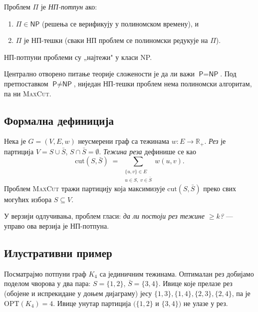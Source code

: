 \begin{definition}
Проблем $\Pi$ је \emph{НП-потпун} ако:
\begin{enumerate}[nosep]
  \item $\Pi \in \textsf{NP}$ (решења се верификују у полиномском времену), и
  \item $\Pi$ је НП-тешки (сваки НП проблем се полиномски редукује на $\Pi$).
\end{enumerate}
НП-потпуни проблеми су „најтежи" у класи \textsf{NP}.
\end{definition}

\begin{remark}
Централно отворено питање теорије сложености је да ли важи $\textsf{P} = \textsf{NP}$.
Под претпоставком $\textsf{P} \neq \textsf{NP}$, ниједан НП-тешки
проблем нема полиномски алгоритам, па ни \textsc{MaxCut}.
\end{remark}

\subsection{Формална дефиниција}

\begin{definition}
Нека је $G = (V, E, w)$ неусмерени граф са тежинама
$w : E \to \mathbb{R}_{+}$.
\emph{Рез} је партиција $V = S \cup \bar{S}$, $S \cap \bar{S} = \emptyset$.
\emph{Тежина реза} дефинише се као
\[
  \mathrm{cut}(S,\bar{S})
  \;=\;
  \sum_{\substack{\{u,v\} \in E \\ u \in S,\; v \in \bar{S}}} w(u,v).
\]
Проблем \textsc{MaxCut} тражи партицију која максимизује $\mathrm{cut}(S,\bar{S})$
преко свих могућих избора $S \subseteq V$.
\end{definition}

У верзији одлучивања, проблем гласи: \emph{да ли постоји рез тежине
$\geq k$?} — управо ова верзија је НП-потпуна.

\subsection{Илустративни пример}

Посматрајмо потпуни граф $K_4$ са јединичним тежинама.
Оптималан рез добијамо поделом чворова у два пара:
$S = \{1, 2\}$, $\bar{S} = \{3, 4\}$.
Ивице које прелазе рез (обојене и испрекидане у доњем дијаграму)
јесу $\{1,3\},\{1,4\},\{2,3\},\{2,4\}$, па је $\mathrm{OPT}(K_4) = 4$.
Ивице унутар партиција $(\{1,2\}$ и $\{3,4\})$ не улазе у рез.

